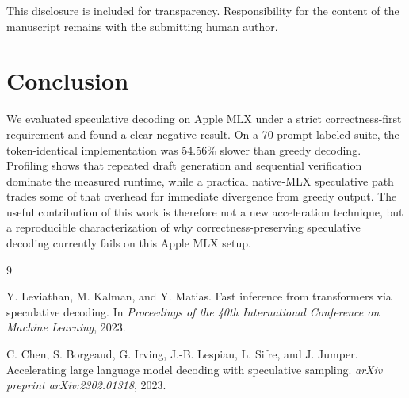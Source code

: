 \documentclass[11pt]{article}
\begin{document}
This disclosure is included for transparency. Responsibility for the content of the manuscript remains with the submitting human author.

\section{Conclusion}

We evaluated speculative decoding on Apple MLX under a strict correctness-first requirement and found a clear negative result. On a 70-prompt labeled suite, the token-identical implementation was 54.56\% slower than greedy decoding. Profiling shows that repeated draft generation and sequential verification dominate the measured runtime, while a practical native-MLX speculative path trades some of that overhead for immediate divergence from greedy output. The useful contribution of this work is therefore not a new acceleration technique, but a reproducible characterization of why correctness-preserving speculative decoding currently fails on this Apple MLX setup.

\begin{thebibliography}{9}

Y. Leviathan, M. Kalman, and Y. Matias.
Fast inference from transformers via speculative decoding.
In \textit{Proceedings of the 40th International Conference on Machine Learning}, 2023.

C. Chen, S. Borgeaud, G. Irving, J.-B. Lespiau, L. Sifre, and J. Jumper.
Accelerating large language model decoding with speculative sampling.
\textit{arXiv preprint arXiv:2302.01318}, 2023.

\end{thebibliography}
\end{document}
